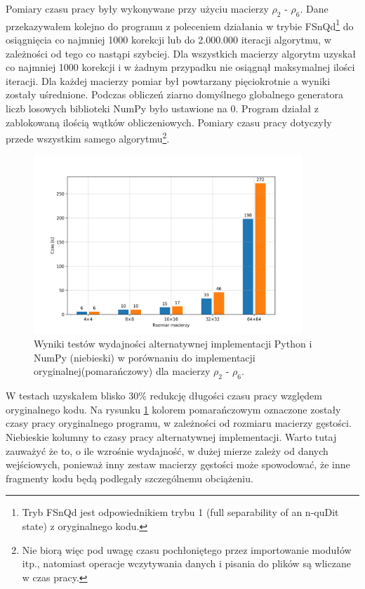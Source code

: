 \documentclass[10pt, a4paper]{article}
\begin{document}
\begin{sloppypar}
    Pomiary czasu pracy były wykonywane przy użyciu macierzy $\rho_{2}$ - $\rho_{6}$.
    Dane przekazywałem kolejno do programu z poleceniem działania w trybie FSnQd\footnote{Tryb
    FSnQd jest odpowiednikiem trybu 1 (full separability of an n-quDit state) z oryginalnego
    kodu.} do osiągnięcia co najmniej 1000 korekcji lub do 2.000.000 iteracji algorytmu,
    w zależności od tego co nastąpi szybciej. Dla wszystkich macierzy algorytm uzyskał
    co najmniej 1000 korekcji i w żadnym przypadku nie osiągnął maksymalnej ilości
    iteracji. Dla każdej macierzy pomiar był powtarzany pięciokrotnie a wyniki zostały uśrednione.
    Podczas obliczeń ziarno domyślnego globalnego generatora liczb losowych biblioteki
    NumPy było ustawione na 0. Program działał z zablokowaną ilością wątków
    obliczeniowych. Pomiary czasu pracy dotyczyły przede wszystkim samego algorytmu\footnote{Nie
    biorą więc pod uwagę czasu pochłoniętego przez importowanie modułów itp., natomiast
    operacje wczytywania danych i pisania do plików są wliczane w czas pracy.}.

    \FloatBarrier
    \begin{figure}[ht]
      \centering
      \includegraphics[width=0.9\textwidth]{"resources/benchmark_2/plot.png"}
      \caption{Wyniki testów wydajności alternatywnej implementacji Python i NumPy (niebieski) w porównaniu do implementacji oryginalnej(pomarańczowy) dla macierzy $\rho
      _{2}$ - $\rho_{6}$.}
      \label{first-perf}
    \end{figure}
    \FloatBarrier

    W testach uzyskałem blisko 30\% redukcję długości czasu pracy względem oryginalnego
    kodu. Na rysunku \ref{first-perf} kolorem pomarańczowym oznaczone zostały czasy pracy
    oryginalnego programu, w zależności od rozmiaru macierzy gęstości. Niebieskie kolumny
    to czasy pracy alternatywnej implementacji. Warto tutaj zauważyć że to, o ile wzrośnie
    wydajność, w dużej mierze zależy od danych wejściowych, ponieważ inny zestaw macierzy
    gęstości może spowodować, że inne fragmenty kodu będą podlegały szczególnemu
    obciążeniu.


\end{sloppypar}
\end{document}
